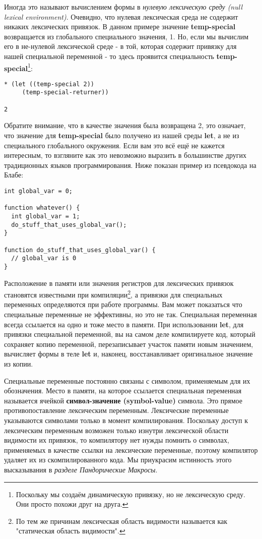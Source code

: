 Иногда это называют вычислением формы в \emph{нулевую лексическую среду (null lexical environment)}. Очевидно, что нулевая лексическая среда не содержит никаких лексических привязок. В данном примере значение \textbf{temp-special} возвращается из глобального специального значения, 1. Но, если мы вычислим его в не-нулевой лексической среде - в той, которая содержит привязку для нашей специальной переменной - то здесь проявится специальность \textbf{temp-special}\footnote{Поскольку мы создаём динамическую привязку, но не лексическую среду. Они просто похожи друг на друга.}:

\begin{verbatim}
* (let ((temp-special 2))
     (temp-special-returner))

2
\end{verbatim}

Обратите внимание, что в качестве значения была возвращена 2, это означает, что значение для \textbf{temp-special} было получено из нашей среды \textbf{let}, а не из специального глобального окружения. Если вам это всё ещё не кажется интересным, то взгляните как это невозможно выразить в большинстве других традиционных языков программирования. Ниже показан пример из псевдокода на Блабе:

\begin{verbatim}
int global_var = 0;

function whatever() {
  int global_var = 1;
  do_stuff_that_uses_global_var();
}

function do_stuff_that_uses_global_var() {
  // global_var is 0
}
\end{verbatim}

Расположение в памяти или значения регистров для лексических привязок становятся известными при компиляции\footnote{По тем же причинам лексическая область видимости называется как "статическая область видимости".}, а привязки для специальных переменных определяются при работе программы. Вам может показаться что специальные переменные не эффективны, но это не так. Специальная переменная всегда ссылается на одно и тоже место в памяти. При использовании \textbf{let}, для привязки специальной переменной, вы на самом деле компилируете код, который сохраняет копию переменной, перезаписывает участок памяти новым значением, вычисляет формы в теле \textbf{let} и, наконец, восстанавливает оригинальное значение из копии.

Специальные переменные постоянно связаны с символом, применяемым для их обозначения. Место в памяти, на которое ссылается специальная переменная называется ячейкой \textbf{символ-значение (symbol-value)} символа. Это прямое противопоставление лексическим переменным. Лексические переменные указываются символами только в момент компилирования. Поскольку доступ к лексическим переменным возможен только изнутри лексической области видимости их привязок, то компилятору нет нужды помнить о символах, применяемых в качестве ссылки на лексические переменные, поэтому компилятор удаляет их из скомпилированного кода. Мы приукрасим истинность этого высказывания в \emph{разделе Пандорические Макросы}.

